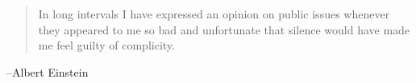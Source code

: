 \documentclass[letterpaper, landscape]{exam}
\begin{document}
  \else
    \vspace{10 cm}
    \begin{quote}
      \begin{em}
        In long intervals I have expressed an opinion on public issues whenever they
        appeared to me so bad and unfortunate that silence would have made me feel guilty
        of complicity. 
      \end{em}
    \end{quote}
    \hspace{1 cm} --Albert Einstein
  \fi
\end{document}
